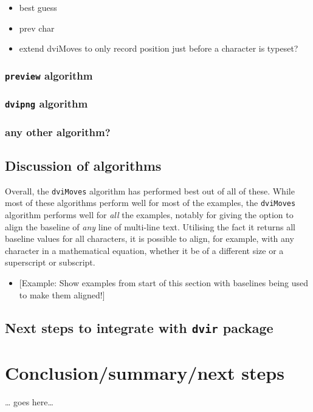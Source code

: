 \documentclass[]{article}
\providecommand{\tightlist}{%
  \setlength{\itemsep}{0pt}\setlength{\parskip}{0pt}}
\begin{document}
\begin{itemize}
\item
  best guess
\item
  prev char
\item
  extend dviMoves to only record position just before a character is
  typeset?
\end{itemize}

\subsubsection{\texorpdfstring{\texttt{preview}
algorithm}{preview algorithm}}\label{preview-algorithm}

\subsubsection{\texorpdfstring{\texttt{dvipng}
algorithm}{dvipng algorithm}}\label{dvipng-algorithm}

\subsubsection{any other algorithm?}\label{any-other-algorithm}

\subsection{Discussion of algorithms}\label{discussion-of-algorithms}

Overall, the \texttt{dviMoves} algorithm has performed best out of all
of these. While most of these algorithms perform well for most of the
examples, the \texttt{dviMoves} algorithm performs well for \emph{all}
the examples, notably for giving the option to align the baseline of
\emph{any} line of multi-line text. Utilising the fact it returns all
baseline values for all characters, it is possible to align, for
example, with any character in a mathematical equation, whether it be of
a different size or a superscript or subscript.

\begin{itemize}
\tightlist
\item
  {[}Example: Show examples from start of this section with baselines
  being used to make them aligned!{]}
\end{itemize}

\subsection{\texorpdfstring{Next steps to integrate with \texttt{dvir}
package}{Next steps to integrate with dvir package}}\label{next-steps-to-integrate-with-dvir-package}

\newpage{}

\section{Conclusion/summary/next
steps}\label{conclusionsummarynext-steps}

\ldots{} goes here\ldots{}
\end{document}
